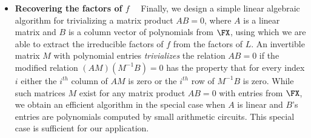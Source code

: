 \begin{itemize}
\item \textbf{Recovering the factors of $f$}~~ Finally, we design a
  simple linear algebraic algorithm for trivializing a matrix product
  $AB=0$, where $A$ is a linear matrix and $B$ is a column vector of
  polynomials from $\FX$, using which we are able to extract the
  irreducible factors of $f$ from the factors of $L$. An invertible
  matrix $M$ with polynomial entries \emph{trivializes} the relation
  $AB=0$ if the modified relation $(AM)(M^{-1}B)=0$ has the property
  that for every index $i$ either the $i^{th}$ column of $AM$ is zero
  or the $i^{th}$ row of $M^{-1}B$ is zero. While such matrices $M$
  exist for any matrix product $AB=0$ with entries from $\FX$, we
  obtain an efficient algorithm in the special case when $A$ is linear
  and $B$'s entries are polynomials computed by small arithmetic
  circuits. This special case is sufficient for our application.
\end{itemize}

